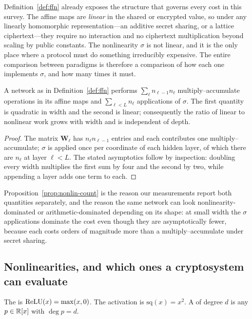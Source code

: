 Definition~\ref{def:ffn} already exposes the structure that governs every cost in
this survey. The affine maps are \emph{linear} in the shared or encrypted value,
so under any linearly homomorphic representation---an additive secret sharing, or
a lattice ciphertext---they require no interaction and no ciphertext
multiplication beyond scaling by public constants. The nonlinearity $\sigma$ is
not linear, and it is the only place where a protocol must do something
irreducibly expensive. The entire comparison between paradigms is therefore a
comparison of how each one implements $\sigma$, and how many times it must.

\begin{proposition}
\label{prop:nonlin-count}
A network as in Definition~\ref{def:ffn} performs
$\sum_{\ell} n_{\ell-1} n_\ell$ multiply--accumulate operations in its affine maps
and $\sum_{\ell < L} n_\ell$ applications of $\sigma$. The first quantity is
quadratic in width and the second is linear; consequently the ratio of linear to
nonlinear work grows with width and is independent of depth.
\end{proposition}

\begin{proof}
The matrix $\mathbf{W}_\ell$ has $n_\ell n_{\ell-1}$ entries and each contributes
one multiply--accumulate; $\sigma$ is applied once per coordinate of each hidden
layer, of which there are $n_\ell$ at layer $\ell < L$. The stated asymptotics
follow by inspection: doubling every width multiplies the first sum by four and
the second by two, while appending a layer adds one term to each.
\end{proof}

Proposition~\ref{prop:nonlin-count} is the reason our measurements report both
quantities separately, and the reason the same network can look
nonlinearity-dominated or arithmetic-dominated depending on its shape: at small
width the $\sigma$ applications dominate the cost even though they are
asymptotically fewer, because each costs orders of magnitude more than a
multiply--accumulate under secret sharing.

\subsection{Nonlinearities, and which ones a cryptosystem can evaluate}
\label{sec:ml:activation}

\begin{definition}
\label{def:relu}
The  is $\mathrm{ReLU}(x) = \max(x,0)$. The 
activation is $\mathrm{sq}(x) = x^2$. A  of degree $d$
is any $p \in \mathbb{R}[x]$ with $\deg p = d$.
\end{definition}

